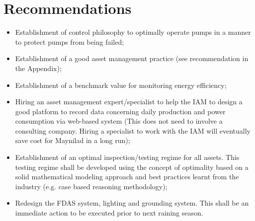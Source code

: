\section{Recommendations}
\begin{itemize}
\item Establishment of control philosophy to optimally operate pumps in a manner to protect pumps from being failed;
\item Establishment of a good asset management practice (see recommendation in the Appendix);
\item Establishment of a benchmark value for monitoring energy efficiency;
\item Hiring an asset management expert/specialist to help the IAM to design a good platform to record data concerning daily production and power consumption via web-based system (This does not need to involve a consulting company. Hiring a specialist to work with the IAM will eventually save cost for Maynilad in a long run);
\item Establishment of an optimal inspection/testing regime for all assets. This testing regime shall be developed using the concept of optimality based on a solid mathematical modeling approach and best practices learnt from the industry (e.g. case based reasoning methodology);
\item Redesign the FDAS system, lighting and grounding system. This shall be an immediate action to be executed prior to next raining season.

\end{itemize}



